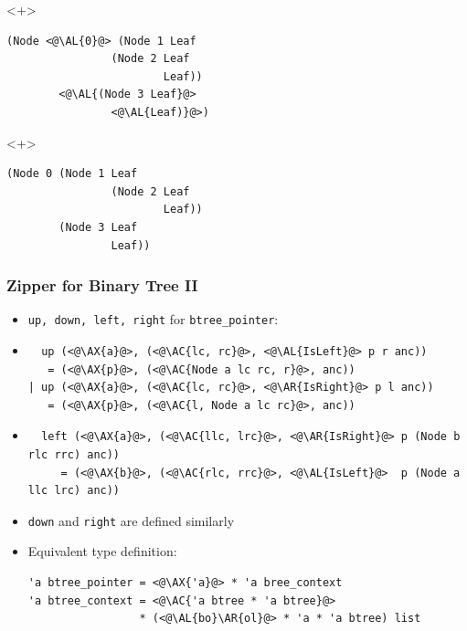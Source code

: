 \begin{frame}[fragile]
\begin{itemize}
\begin{itemize}
\begin{onlyenv}<+>
\begin{lstlisting}
(Node <@\AL{0}@> (Node 1 Leaf
                (Node 2 Leaf
                        Leaf))
        <@\AL{(Node 3 Leaf}@>
                <@\AL{Leaf)}@>)
\end{lstlisting}
\end{onlyenv}

\begin{onlyenv}<+>
\color{gray}
\begin{lstlisting}
(Node 0 (Node 1 Leaf
                (Node 2 Leaf
                        Leaf))
        (Node 3 Leaf
                Leaf))
\end{lstlisting}
\end{onlyenv}
\end{itemize}

\end{itemize}
\end{frame}

\begin{frame}[fragile]
\frametitle{Zipper for Binary Tree II}

\newcommand{\AX}[1]{\textcolor{red}{#1}}
\newcommand{\AC}[1]{\textcolor{blue}{#1}}
\newcommand{\AL}[1]{\textcolor{green}{#1}}
\newcommand{\AR}[1]{\textcolor{cyan}{#1}}
\newcommand{\AT}[1]{\textcolor{gray}{#1}}

\begin{itemize}
\item \lstinline|up, down, left, right| for \lstinline|btree_pointer|:

\item
\begin{lstlisting}
  up (<@\AX{a}@>, (<@\AC{lc, rc}@>, <@\AL{IsLeft}@> p r anc))
   = (<@\AX{p}@>, (<@\AC{Node a lc rc, r}@>, anc))
| up (<@\AX{a}@>, (<@\AC{lc, rc}@>, <@\AR{IsRight}@> p l anc))
   = (<@\AX{p}@>, (<@\AC{l, Node a lc rc}@>, anc))
\end{lstlisting}

\item
\begin{lstlisting}
  left (<@\AX{a}@>, (<@\AC{llc, lrc}@>, <@\AR{IsRight}@> p (Node b rlc rrc) anc))
     = (<@\AX{b}@>, (<@\AC{rlc, rrc}@>, <@\AL{IsLeft}@>  p (Node a llc lrc) anc))
\end{lstlisting}

\item \lstinline|down| and \lstinline|right| are defined similarly

\item Equivalent type definition:\\
\begin{lstlisting}
'a btree_pointer = <@\AX{'a}@> * 'a bree_context
'a btree_context = <@\AC{'a btree * 'a btree}@>
                 * (<@\AL{bo}\AR{ol}@> * 'a * 'a btree) list
\end{lstlisting}
\end{itemize}
\end{frame}

